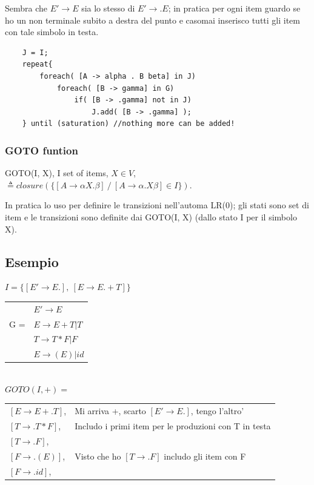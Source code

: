 Sembra che $E' \rightarrow E$ sia lo stesso di $E' \rightarrow .E$; in pratica per ogni item guardo se ho un non terminale subito a 
destra del punto e casomai inserisco tutti gli item con tale simbolo in testa.

\begin{lstlisting}
    J = I;
    repeat{
        foreach( [A -> alpha . B beta] in J) 
            foreach( [B -> gamma] in G)
                if( [B -> .gamma] not in J)
                    J.add( [B -> .gamma] );
    } until (saturation) //nothing more can be added!
\end{lstlisting}

\subsubsection{GOTO funtion}
GOTO(I, X), I set of items, $X \in V$, $\triangleq closure( \{[A \rightarrow \alpha X. \beta] \ / \ [A \rightarrow \alpha .X \beta] \in I \} ) $. 

In pratica lo uso per definire le transizioni nell'automa LR(0); gli stati sono set di item e le transizioni sono definite dai GOTO(I, X) 
(dallo stato I per il simbolo X).

\subsection{Esempio}

$ I = \{ [E' \rightarrow E.],\ [E \rightarrow E. +T] \}$
\begin{tabular}{|ll}
        &   $E' \rightarrow E$\\
   G =  &    $E \rightarrow E + T| T$\\
        &   $T \rightarrow T * F | F$\\
        &   $E \rightarrow (E)|id$\\
\end{tabular}\\[10pt]


$GOTO(I, +) = $
\begin{tabular}{|ll|}
    $[E \rightarrow E + .T]$,   &   Mi arriva +, scarto $[E' \rightarrow E.]$, tengo l'altro'    \\
    $[T \rightarrow .T * F]$,   &   Includo i primi item per le produzioni con T in testa    \\
    $[T \rightarrow .F]$,       &       \\
    $[F \rightarrow .(E)]$,     &   Visto che ho $[T \rightarrow .F]$ includo gli item con F\\
    $[F \rightarrow .id]$,      &       \\
\end{tabular}\\[10pt]

